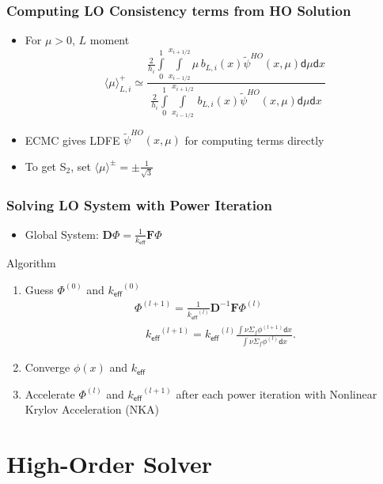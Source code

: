 \documentclass[xcolor=dvipsnames,handout,unknownkeysallowed]{beamer}
\newcommand{\keff}[0]{\ensuremath{{k}_{\textsf{eff}}} }
\newcommand{\colb}[1]{{\color{blue} #1}}
\newlength{\wideitemsep}
\let\olditem\item
\renewcommand{\item}{\setlength{\itemsep}{\wideitemsep}\olditem}
\newcommand{\B}[1]{\ensuremath{\mathbf{#1}}}
\renewcommand{\d}{\mathsf{d}}
\newcommand{\mom}[1]{\langle #1 \rangle}
\newcommand{\xl}{{x_{i-1/2}}}
\newcommand{\xr}{{x_{i+1/2}}}
\begin{document}
\begin{frame}
    \frametitle{Computing LO Consistency terms from HO Solution}
    \begin{itemize}
        \item For $\mu>0$, $L$ moment
    \begin{equation}
\mom{{\mu}}_{L,i}^{+} \simeq \frac{\displaystyle 
\frac{2}{h_i} \int\limits_0^1 \int\limits_\xl^\xr \mu \, b_{L,i}(x) \tilde \psi^{HO}(x,\mu) \d \mu \d x } 
{\displaystyle \frac{2}{h_i} \int\limits_0^1 \int\limits_\xl^\xr \, b_{L,i}(x)
\tilde \psi^{HO}(x,\mu) \d \mu \d x } 
    \end{equation}
        \item ECMC gives LDFE $\tilde  \psi^{HO}(x,\mu)$ for computing terms directly
        \item To get S$_2$, set $\mom{\mu}^\pm = \pm \frac{1}{\sqrt{3}}$ 
    \end{itemize}

\end{frame}

\begin{frame}
    \frametitle{Solving LO System with Power Iteration}
    \begin{itemize}
        \item Global System: \hspace{0.8in}${\displaystyle \B D \Phi = \frac{1}{\keff} \B F \Phi}$
     \end{itemize}
     \begin{block}{Algorithm}
         \begin{enumerate}
        \item Guess $\Phi^{(0)}$ and $\keff^{(0)}$
        \begin{align*}
    \Phi^{(l+1)} = \frac{1}{\keff^{(l)}} \B D^{-1} \B F \Phi^{(l)} \\
    \quad \keff^{(l+1)} = \keff^{(l)}\frac{ \int \nu \Sigma_f \phi^{(l+1)} \d
    x}{ \int \nu \Sigma_f \phi^{(l)}\d x }.
        \end{align*}
    \item Converge $\phi(x)$ and \keff \pause
    \item \colb{Accelerate} $\Phi^{(l)}$ and $\keff^{(l+1)}$ after each power iteration
        with Nonlinear Krylov Acceleration (NKA)
     \end{enumerate}
    \end{block}
\end{frame}

\section{High-Order Solver}
\end{document}
